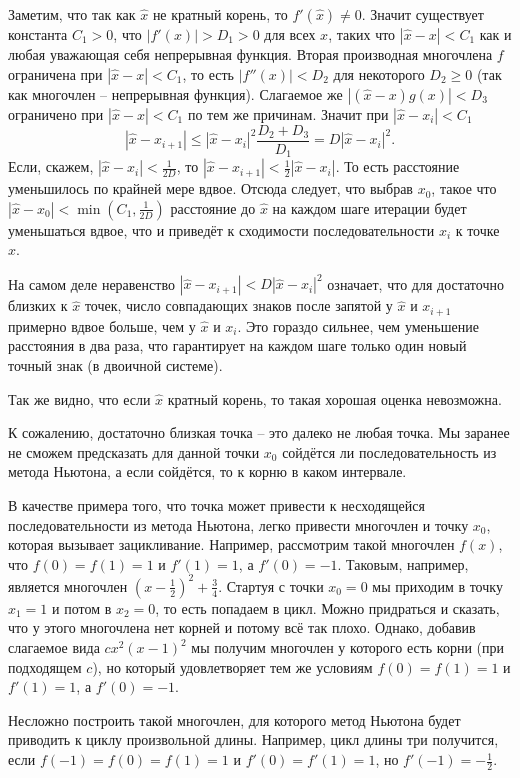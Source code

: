 Заметим, что так как $\hat{x}$ не кратный корень, то $f'(\hat{x})\neq 0$. Значит существует константа $C_1>0$, что  $|f'(x)|>D_1>0$ для всех $x$, таких что $|\hat{x}-x|<C_1$ как и любая уважающая себя непрерывная функция. Вторая производная многочлена $f$ ограничена при $|\hat{x}-x|<C_1$, то есть $|f''(x)|<D_2$ для некоторого $D_2 \geq 0$ (так как многочлен -- непрерывная функция). Слагаемое же $|(\hat{x}-x) g(x)|<D_3$  ограничено при $|\hat{x}-x|<C_1$ по тем же причинам. 
Значит при $|\hat{x}-x_i|<C_1$
$$|\hat{x}-x_{i+1}|\leq |\hat{x}-x_i|^2 \frac{D_2+D_3}{D_1}= D |\hat{x}-x_i|^2.$$
Если, скажем, $|\hat{x}-x_i|<\frac{1}{2D}$, то $|\hat{x}-x_{i+1}|<\frac{1}{2}|\hat{x}-x_i|$. То есть расстояние уменьшилось по крайней мере вдвое. Отсюда следует, что выбрав $x_0$, такое что $|\hat{x}-x_0|<\min (C_1,\frac{1}{2D})$ расстояние до $\hat{x}$ на каждом шаге итерации будет уменьшаться вдвое, что и приведёт к сходимости последовательности $x_i$ к точке $\hat{x}$.
\endproof

На самом деле неравенство $|\hat{x}-x_{i+1}|<D|\hat{x}-x_i|^2$ означает, что для достаточно близких к $\hat{x}$ точек, число совпадающих знаков после запятой у $\hat{x}$ и $x_{i+1}$ примерно вдвое больше, чем у $\hat{x}$ и $x_i$. Это гораздо сильнее, чем уменьшение расстояния в два раза, что гарантирует на каждом шаге только один новый точный знак (в двоичной системе).

Так же видно, что если $\hat{x}$ кратный корень, то такая хорошая оценка невозможна.

К сожалению, достаточно близкая точка -- это далеко не любая точка. Мы  заранее не сможем предсказать для данной точки $x_0$ сойдётся ли последовательность из метода Ньютона, а если сойдётся, то к корню в каком интервале.

В качестве примера того, что точка может привести к несходящейся последовательности из метода Ньютона, легко привести многочлен и точку $x_0$, которая вызывает зацикливание. Например, рассмотрим такой многочлен $f(x)$, что $f(0)=f(1)=1$ и $f'(1)=1$, а $f'(0)=-1$. Таковым, например, является многочлен $(x-\frac{1}{2})^2+\frac{3}{4}$. Стартуя с точки $x_0=0$ мы приходим в точку $x_1=1$ и потом в $x_2=0$, то есть попадаем в цикл. Можно придраться и сказать, что у этого многочлена нет корней и потому всё так плохо. Однако, добавив слагаемое вида $c x^2(x-1)^2$ мы получим многочлен у которого есть корни (при подходящем $c$), но который удовлетворяет тем же условиям $f(0)=f(1)=1$ и $f'(1)=1$, а $f'(0)=-1$.

Несложно построить такой многочлен, для которого метод Ньютона будет приводить к циклу произвольной длины. Например, цикл длины три получится, если $f(-1)=f(0)=f(1)=1$ и $f'(0)=f'(1)=1$, но $f'(-1)=-\frac{1}{2}$.



